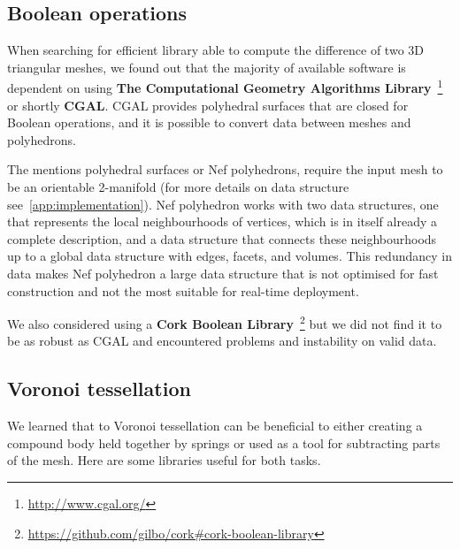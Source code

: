 \subsection{Boolean operations}
When searching for efficient library able to compute the difference of two 3D triangular meshes, we found out that the majority of available software
is dependent on using \textbf{The Computational Geometry Algorithms Library}~\footnote{\url{http://www.cgal.org/}} or shortly \textbf{CGAL}. CGAL provides polyhedral surfaces that are closed for Boolean operations, and it is possible to convert data between meshes and polyhedrons. 

The mentions polyhedral surfaces or Nef polyhedrons, require the input mesh to be an orientable 2-manifold (for more details on data structure see~\cref{app:implementation}). Nef polyhedron works with two data structures, one that represents the local neighbourhoods of vertices, which is in itself already a complete description, and a data structure that connects these neighbourhoods up to a global data structure with edges, facets, and volumes. This redundancy in data makes Nef polyhedron a large data structure that is not optimised for fast construction and not the most suitable for real-time deployment.

We also considered using a \textbf{Cork Boolean Library}~\footnote{\url{https://github.com/gilbo/cork\#cork-boolean-library}} but we did not find it to be as robust as CGAL and encountered problems and instability on valid data.

\subsection{Voronoi tessellation}
We learned that to Voronoi tessellation can be beneficial to either creating a compound body held together by springs or used as a tool for subtracting parts of the mesh. Here are some libraries useful for both tasks.

